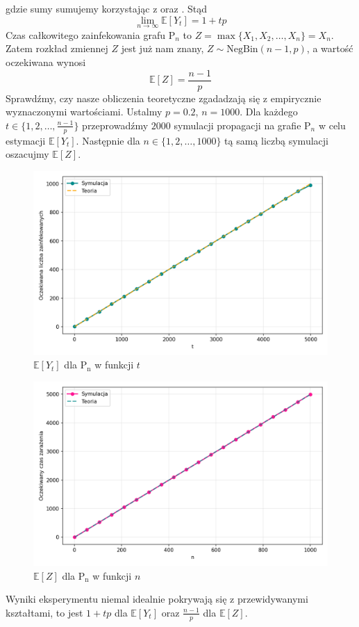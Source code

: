 gdzie sumy sumujemy korzystając z  oraz . Stąd
\[
    \lim_{n \to \infty}\mathbb{E}[Y_t] = 1+tp
\]
Czas całkowitego zainfekowania grafu $\mathrm{P}_n$ to $Z = \max\{X_1,X_2,\dots,X_n\} = X_n$. Zatem rozkład zmiennej $Z$ jest już nam znany, $Z\sim\mathrm{NegBin}(n-1,p)$, a wartość oczekiwana wynosi 
\[
    \mathbb{E}[Z]=\frac{n-1}{p}
\]
Sprawdźmy, czy nasze obliczenia teoretyczne zgadadzają się z empirycznie wyznaczonymi wartościami. Ustalmy $p=0.2$, $n=1000$. Dla każdego $t\in\{1, 2, \dots, \frac{n-1}{p}\}$ przeprowadźmy $2000$ symulacji propagacji na grafie $\mathrm{P}_n$ w celu estymacji $\mathbb{E}[Y_t]$. Następnie dla $n\in\{1,2,\dots,1000\}$ tą samą liczbą symulacji oszacujmy $\mathbb{E}[Z]$. 
\begin{figure}[h!]
    \centering
    \includegraphics[width=1\textwidth]{../img/path/final_infection_expectations.png}
    \caption{$\mathbb{E}[Y_t]$ dla $\mathrm{P_n}$ w funkcji $t$}
\end{figure}
\begin{figure}[h!]
    \centering
    \includegraphics[width=1\textwidth]{../img/path/full_infection_expectation.png}
    \caption{$\mathbb{E}[Z]$ dla $\mathrm{P_n}$ w funkcji $n$}
\end{figure}
Wyniki eksperymentu niemal idealnie pokrywają się z przewidywanymi kształtami, to jest $1+tp$ dla $\mathbb{E}[Y_t]$ oraz $\frac{n-1}{p}$ dla $\mathbb{E}[Z]$.


